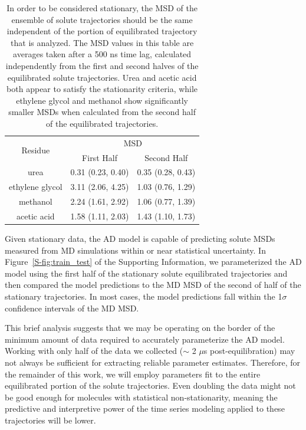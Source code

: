 \documentclass[aps,pre,preprint,groupedaddress]{revtex4-2}
\begin{document}
  \begin{table}[h]
  \centering
  \begin{tabular}{|c|c|c|}
  \hline
  \multirow{2}{*}{Residue} & \multicolumn{2}{c|}{MSD}            \\\cline{2-3}
                           & First Half       & Second Half      \\\hline
  urea                     & 0.31 (0.23, 0.40)& 0.35 (0.28, 0.43)\\\hline
  ethylene glycol          & 3.11 (2.06, 4.25)& 1.03 (0.76, 1.29)\\\hline
  methanol                 & 2.24 (1.61, 2.92)& 1.06 (0.77, 1.39)\\\hline
  acetic acid              & 1.58 (1.11, 2.03)& 1.43 (1.10, 1.73)\\\hline

  \end{tabular}
  \caption{In order to be considered stationary, the MSD of the ensemble of solute 
  trajectories should be the same independent of the portion of equilibrated 
  trajectory that is analyzed. The MSD values in this table are averages taken 
  after a 500 ns time lag, calculated independently from the first and second 
  halves of the equilibrated solute trajectories. Urea and acetic acid both 
  appear to satisfy the stationarity criteria, while ethylene glycol and methanol
  show significantly smaller MSDs when calculated from the second half of the 
  equilibrated trajectories.}\label{table:stationarity}
  \end{table}

  Given stationary data, the AD model is capable of predicting solute MSDs 
  measured from MD simulations within or near statistical uncertainty.
  In Figure~\ref{S-fig:train_test} of the Supporting Information, we parameterized 
  the AD model using the first half of the stationary solute equilibrated trajectories 
  and then compared the model predictions to the MD MSD of the second of half 
  of the stationary trajectories. In most cases, the model predictions fall within
  the 1$\sigma$ confidence intervals of the MD MSD.
  
  This brief analysis suggests that we may be operating on the border of the minimum 
  amount of data required to accurately parameterize the AD model. Working with 
  only half of the data we collected ($\sim$ 2 $\mu$s post-equilibration) may not
  always be sufficient for extracting reliable parameter estimates. Therefore, for 
  the remainder of this work, we will employ parameters fit to the entire
  equilibrated portion of the solute trajectories. Even doubling the data might 
  not be good enough for molecules with statistical non-stationarity, 
  meaning the predictive and interpretive power of the time series modeling applied to these 
  trajectories will be lower.
\end{document}
